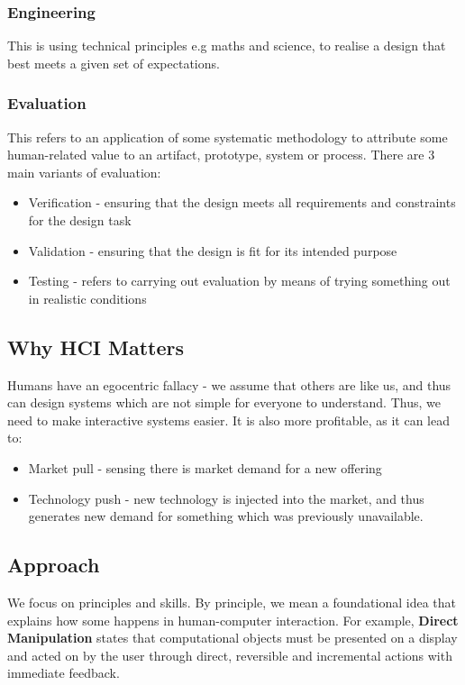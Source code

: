 \documentclass{article}
\begin{document}
\subsubsection{Engineering}
This is using technical principles e.g maths and science, to realise a design that best meets a given set of expectations.
\subsubsection{Evaluation}
This refers to an application of some systematic methodology to attribute some human-related value to an artifact, prototype, system or process. There are 3 main variants of evaluation:
\begin{itemize}
    \item Verification - ensuring that the design meets all requirements and constraints for the design task
    \item Validation - ensuring that the design is fit for its intended purpose
    \item Testing - refers to carrying out evaluation by means of trying something out in realistic conditions
\end{itemize}
\subsection{Why HCI Matters}
Humans have an egocentric fallacy - we assume that others are like us, and thus can design systems which are not simple for everyone to understand. Thus, we need to make interactive systems easier. It is also more profitable, as it can lead to:
\begin{itemize}
    \item Market pull - sensing there is market demand for a new offering
    \item Technology push - new technology is injected into the market, and thus generates new demand for something which was previously unavailable.
\end{itemize}
\subsection{Approach}
We focus on principles and skills. By principle, we mean a foundational idea that explains how some happens in human-computer interaction. For example, \textbf{Direct Manipulation} states that computational objects must be presented on a display and acted on by the user through direct, reversible and incremental actions with immediate feedback.
\end{document}
